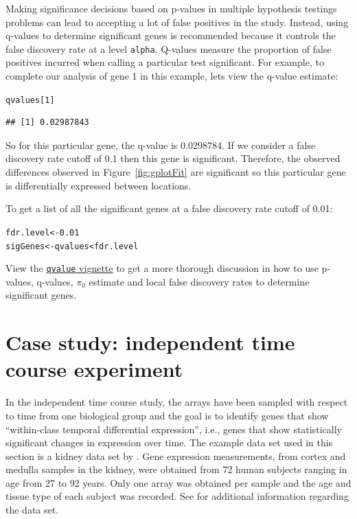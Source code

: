 \documentclass{article}\usepackage[]{graphicx}\usepackage[]{color}
\makeatletter
\newcommand{\hlnum}[1]{\textcolor[rgb]{0.686,0.059,0.569}{#1}}%
\newcommand{\hlopt}[1]{\textcolor[rgb]{0,0,0}{#1}}%
\newcommand{\hlstd}[1]{\textcolor[rgb]{0.345,0.345,0.345}{#1}}%
\newcommand{\hlkwb}[1]{\textcolor[rgb]{0.69,0.353,0.396}{#1}}%
\newenvironment{kframe}{%
 \def\at@end@of@kframe{}%
 \ifinner\ifhmode%
  \def\at@end@of@kframe{\end{minipage}}%
  \begin{minipage}{\columnwidth}%
 \fi\fi%
 \def\FrameCommand##1{\hskip\@totalleftmargin \hskip-\fboxsep
 \colorbox{shadecolor}{##1}\hskip-\fboxsep
     \hskip-\linewidth \hskip-\@totalleftmargin \hskip\columnwidth}%
 \MakeFramed {\advance\hsize-\width
   \@totalleftmargin\z@ \linewidth\hsize
   \@setminipage}}%
 {\par\unskip\endMakeFramed%
 \at@end@of@kframe}
\newenvironment{knitrout}{}{} %
\makeatother
\begin{document}
Making significance decisions based on p-values in multiple hypothesis testings problems can lead to accepting a lot of false positives in the study. Instead, using q-values to determine significant genes is recommended because it controls the false discovery rate at a level {\tt alpha}. Q-values measure the proportion of false positives incurred when calling a particular test significant. For example, to complete our analysis of gene 1 in this example, lets view the q-value estimate:
\begin{knitrout}
\color{fgcolor}\begin{kframe}
\begin{alltt}
\hlstd{qvalues[}\hlnum{1}\hlstd{]}
\end{alltt}
\begin{verbatim}
## [1] 0.02987843
\end{verbatim}
\end{kframe}
\end{knitrout}

So for this particular gene, the q-value is 0.0298784. If we consider a false discovery rate cutoff of 0.1 then this gene is significant. Therefore, the observed differences observed in Figure~\ref{fig:gplotFit} are significant so this particular gene is differentially expressed between locations. 

To get a list of all the significant genes at a false discovery rate cutoff of 0.01:
\begin{knitrout}
\color{fgcolor}\begin{kframe}
\begin{alltt}
\hlstd{fdr.level} \hlkwb{<-} \hlnum{0.01}
\hlstd{sigGenes} \hlkwb{<-} \hlstd{qvalues} \hlopt{<} \hlstd{fdr.level}
\end{alltt}
\end{kframe}
\end{knitrout}

View the \href{http://www.bioconductor.org/packages/release/bioc/html/qvalue.html}{{\tt qvalue} vignette} to get a more thorough discussion in how to use p-values, q-values, $\pi_{0}$ estimate and local false discovery rates to determine significant genes.

\section{Case study: independent time course experiment}
\label{sec:kidney}
In the independent time course study, the arrays have been sampled with respect to time from one biological group and the goal is to identify genes that show ``within-class temporal differential expression'', i.e., genes that show statistically significant changes in expression over time. The example data set used in this section is a kidney data set by \cite{rodwell:2004}. Gene expression measurements, from cortex and medulla samples in the kidney, were obtained from 72 human subjects ranging in age from 27 to 92 years. Only one array was obtained per sample and the age and tissue type of each subject was recorded. See \cite{rodwell:2004} for additional information regarding the data set.
\end{document}
